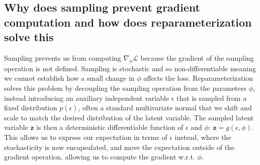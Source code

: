 \documentclass[a4paper]{article}
\begin{document}
\subsection{Why does sampling prevent gradient computation and how does reparameterization solve this}
Sampling prevents us from computing $\nabla_{\phi}\mathcal{L} $ because the gradient of the sampling operation is not defined. Sampling
is stochastic and so non-differentiable meaning we cannot establish how a small change in $\phi$ affects the loss.\newline
Reparameterization solves this problem by decoupling the sampling operation from the parameters $\phi$, instead introducing an auxiliary
independent variable $\epsilon$ that is sampled from a fixed distribution $p(\epsilon)$, often a standard multivariate normal that we
shift and scale to match the desired distribution of the latent variable. The sampled latent variable $\bm{z}$ is then a deterministic
differentiable function of $\epsilon$ and $\phi$: $\bm{z} = g(\epsilon, \phi)$. This allows us to express our expectation in terms of
$\epsilon$ instead, where the stochasticity is now encapsulated, and move the expectation outside of the gradient operation, allowing us
to compute the gradient w.r.t. $\phi$.
\end{document}
